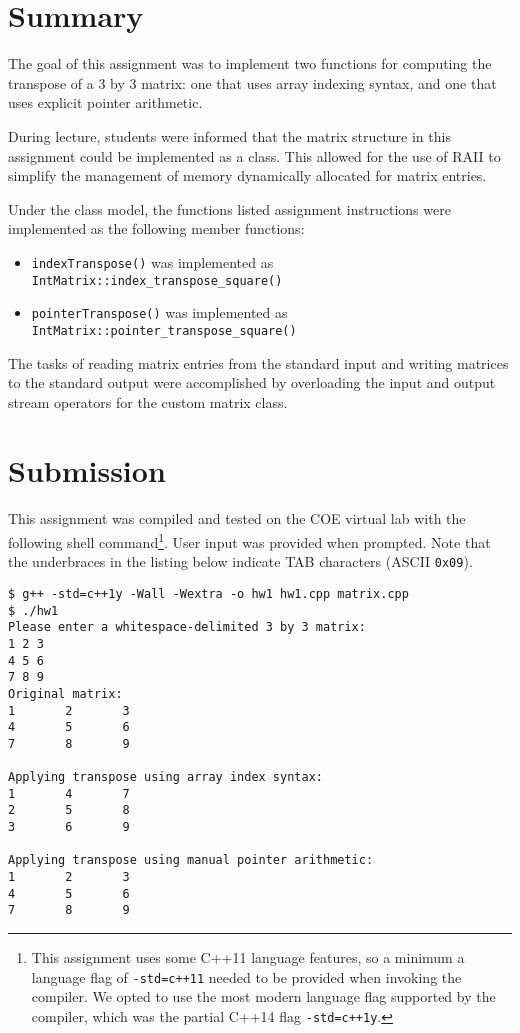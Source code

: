 \documentclass[11pt, letterpaper]{article} %
\begin{document}
  \makelabtitle
  
\section*{Summary}
The goal of this assignment was to implement two functions for computing the transpose of a $3$ by $3$ matrix: one that uses array indexing syntax, and one that uses explicit pointer arithmetic.

During lecture, students were informed that the matrix structure in this assignment could be implemented as a class. This allowed for the use of RAII \cite{cppreference-raii} to simplify the management of memory dynamically allocated for matrix entries.

Under the class model, the functions listed assignment instructions were implemented as the following member functions:
\begin{itemize}
    \item \texttt{indexTranspose()} was implemented as \texttt{IntMatrix::index\_transpose\_square()}
    \item \texttt{pointerTranspose()} was implemented as \texttt{IntMatrix::pointer\_transpose\_square()}
\end{itemize}

The tasks of reading matrix entries from the standard input and writing matrices to the standard output were accomplished by overloading the input and output stream operators for the custom matrix class. 



\section*{Submission}

This assignment was compiled and tested on the COE virtual lab \cite{coe-vlab} with the following shell command\footnote{This assignment uses some C++11 language features, so a minimum a language flag of \texttt{-std=c++11} needed to be provided when invoking the compiler. We opted to use the most modern language flag supported by the compiler, which was the partial C++14 flag \texttt{-std=c++1y}.}. User input was provided when prompted. Note that the underbraces in the listing below indicate TAB characters (ASCII \texttt{0x09}).
\begin{lstlisting}[style=labreportstyle-sh]
$ g++ -std=c++1y -Wall -Wextra -o hw1 hw1.cpp matrix.cpp
$ ./hw1
Please enter a whitespace-delimited 3 by 3 matrix:
1 2 3
4 5 6
7 8 9
Original matrix:
1		2		3
4		5		6
7		8		9

Applying transpose using array index syntax:
1		4		7
2		5		8
3		6		9

Applying transpose using manual pointer arithmetic:
1		2		3
4		5		6
7		8		9
\end{lstlisting}






  



  
\end{document}
